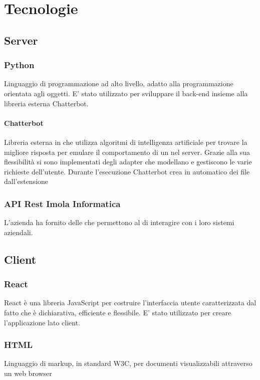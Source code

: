 \section{Tecnologie}
\subsection{Server}
\subsubsection{Python}
Linguaggio di programmazione ad alto livello, adatto alla programmazione orientata agli oggetti. E' stato utilizzato per sviluppare il back-end insieme alla libreria esterna Chatterbot.
\paragraph{Chatterbot}
Libreria esterna in  che utilizza algoritmi di intelligenza artificiale per trovare la migliore risposta per emulare il comportamento di un  nel server. \newline
Grazie alla sua flessibilità si sono implementati degli adapter che modellano e gestiscono le varie richieste dell'utente. \newline
Durante l'esecuzione Chatterbot crea in automatico dei file dall'estensione  
\subsubsection{API Rest Imola Informatica}
L'azienda ha fornito delle  che permettono al  di interagire con i loro sistemi aziendali.

\subsection{Client}
\subsubsection{React}
React è una libreria JavaScript per costruire l'interfaccia utente caratterizzata dal fatto che è dichiarativa, efficiente e flessibile. E' stato utilizzato per creare l'applicazione lato client.
\subsubsection{HTML}
Linguaggio di markup, in standard W3C, per documenti visualizzabili attraverso un web browser
